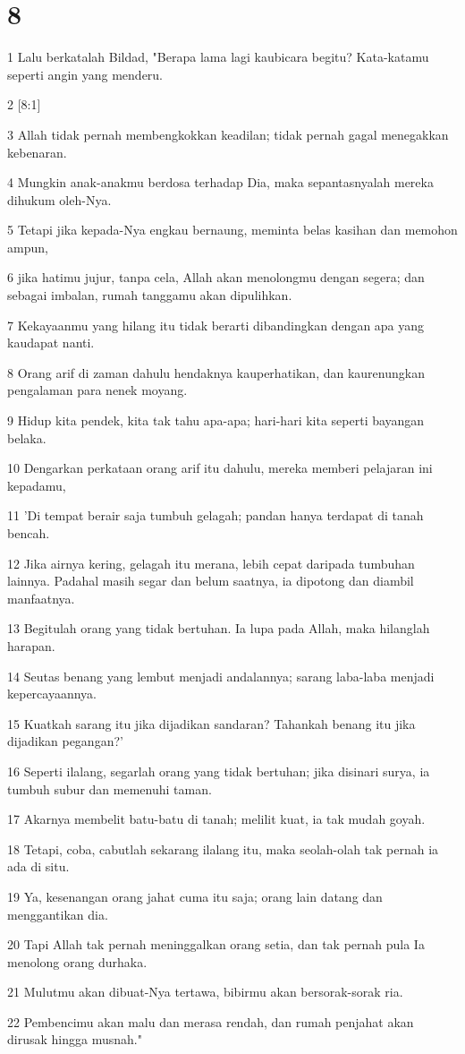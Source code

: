 \chapter{8}

\par 1 Lalu berkatalah Bildad, "Berapa lama lagi kaubicara begitu? Kata-katamu seperti angin yang menderu.
\par 2 [8:1]
\par 3 Allah tidak pernah membengkokkan keadilan; tidak pernah gagal menegakkan kebenaran.
\par 4 Mungkin anak-anakmu berdosa terhadap Dia, maka sepantasnyalah mereka dihukum oleh-Nya.
\par 5 Tetapi jika kepada-Nya engkau bernaung, meminta belas kasihan dan memohon ampun,
\par 6 jika hatimu jujur, tanpa cela, Allah akan menolongmu dengan segera; dan sebagai imbalan, rumah tanggamu akan dipulihkan.
\par 7 Kekayaanmu yang hilang itu tidak berarti dibandingkan dengan apa yang kaudapat nanti.
\par 8 Orang arif di zaman dahulu hendaknya kauperhatikan, dan kaurenungkan pengalaman para nenek moyang.
\par 9 Hidup kita pendek, kita tak tahu apa-apa; hari-hari kita seperti bayangan belaka.
\par 10 Dengarkan perkataan orang arif itu dahulu, mereka memberi pelajaran ini kepadamu,
\par 11 'Di tempat berair saja tumbuh gelagah; pandan hanya terdapat di tanah bencah.
\par 12 Jika airnya kering, gelagah itu merana, lebih cepat daripada tumbuhan lainnya. Padahal masih segar dan belum saatnya, ia dipotong dan diambil manfaatnya.
\par 13 Begitulah orang yang tidak bertuhan. Ia lupa pada Allah, maka hilanglah harapan.
\par 14 Seutas benang yang lembut menjadi andalannya; sarang laba-laba menjadi kepercayaannya.
\par 15 Kuatkah sarang itu jika dijadikan sandaran? Tahankah benang itu jika dijadikan pegangan?'
\par 16 Seperti ilalang, segarlah orang yang tidak bertuhan; jika disinari surya, ia tumbuh subur dan memenuhi taman.
\par 17 Akarnya membelit batu-batu di tanah; melilit kuat, ia tak mudah goyah.
\par 18 Tetapi, coba, cabutlah sekarang ilalang itu, maka seolah-olah tak pernah ia ada di situ.
\par 19 Ya, kesenangan orang jahat cuma itu saja; orang lain datang dan menggantikan dia.
\par 20 Tapi Allah tak pernah meninggalkan orang setia, dan tak pernah pula Ia menolong orang durhaka.
\par 21 Mulutmu akan dibuat-Nya tertawa, bibirmu akan bersorak-sorak ria.
\par 22 Pembencimu akan malu dan merasa rendah, dan rumah penjahat akan dirusak hingga musnah."

